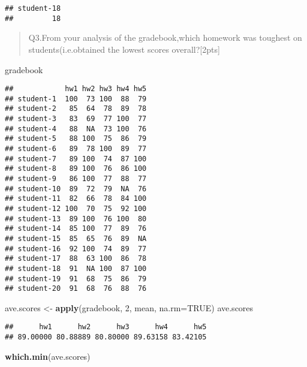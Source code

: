 \documentclass[
]{article}
\newenvironment{Shaded}{\begin{snugshade}}{\end{snugshade}}
\newcommand{\AttributeTok}[1]{\textcolor[rgb]{0.13,0.29,0.53}{#1}}
\newcommand{\ConstantTok}[1]{\textcolor[rgb]{0.56,0.35,0.01}{#1}}
\newcommand{\DecValTok}[1]{\textcolor[rgb]{0.00,0.00,0.81}{#1}}
\newcommand{\FunctionTok}[1]{\textcolor[rgb]{0.13,0.29,0.53}{\textbf{#1}}}
\newcommand{\NormalTok}[1]{#1}
\newcommand{\OtherTok}[1]{\textcolor[rgb]{0.56,0.35,0.01}{#1}}
\begin{document}
\begin{verbatim}
## student-18 
##         18
\end{verbatim}

\begin{quote}
Q3.From your analysis of the gradebook,which homework was toughest on
students(i.e.obtained the lowest scores overall?{[}2pts{]}
\end{quote}

\begin{Shaded}
\begin{Highlighting}[]
\NormalTok{gradebook}
\end{Highlighting}
\end{Shaded}

\begin{verbatim}
##            hw1 hw2 hw3 hw4 hw5
## student-1  100  73 100  88  79
## student-2   85  64  78  89  78
## student-3   83  69  77 100  77
## student-4   88  NA  73 100  76
## student-5   88 100  75  86  79
## student-6   89  78 100  89  77
## student-7   89 100  74  87 100
## student-8   89 100  76  86 100
## student-9   86 100  77  88  77
## student-10  89  72  79  NA  76
## student-11  82  66  78  84 100
## student-12 100  70  75  92 100
## student-13  89 100  76 100  80
## student-14  85 100  77  89  76
## student-15  85  65  76  89  NA
## student-16  92 100  74  89  77
## student-17  88  63 100  86  78
## student-18  91  NA 100  87 100
## student-19  91  68  75  86  79
## student-20  91  68  76  88  76
\end{verbatim}

\begin{Shaded}
\begin{Highlighting}[]
\NormalTok{ave.scores }\OtherTok{\textless{}{-}} \FunctionTok{apply}\NormalTok{(gradebook, }\DecValTok{2}\NormalTok{, mean, }\AttributeTok{na.rm=}\ConstantTok{TRUE}\NormalTok{)}
\NormalTok{ave.scores}
\end{Highlighting}
\end{Shaded}

\begin{verbatim}
##      hw1      hw2      hw3      hw4      hw5 
## 89.00000 80.88889 80.80000 89.63158 83.42105
\end{verbatim}

\begin{Shaded}
\begin{Highlighting}[]
\FunctionTok{which.min}\NormalTok{(ave.scores)}
\end{Highlighting}
\end{Shaded}
\end{document}
